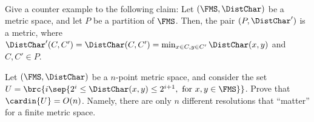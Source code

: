 \begin{exercise} ~

    \begin{compactenuma}
        \item Give a counter example to the following claim: Let
        $(\FMS,\DistChar)$ be a metric space, and let $P$ be a
        partition of $\FMS$. Then, the pair $(P,\DistChar')$ is a
        metric, where
        $\DistChar'(C, C') = \DistChar(C, C')=\min_{x \in C, y \in C'}
        \DistChar(x,y)$ and $C, C' \in P$.
        
        \item Let $(\FMS,\DistChar)$ be a $n$-point metric space, and
        consider the set
        $U = \brc{ i \sep{ 2^i \leq \DistChar(x,y) \leq 2^{i+1},
              \text{ for } x,y \in \FMS}}$. Prove that
        $\cardin{U} = O(n)$. Namely, there are only $n$ different
        resolutions that ``matter'' for a finite metric space.
    \end{compactenuma}
\end{exercise}



